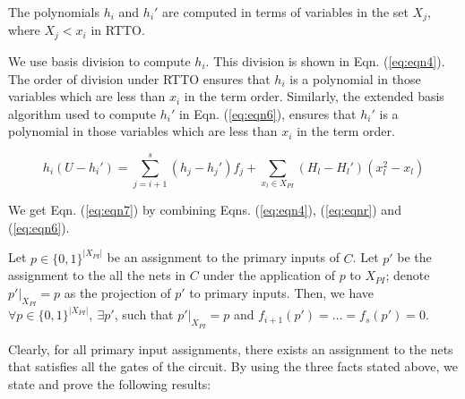 
\begin{Fact}
The polynomials $h_i$ and $h_i'$ are computed in terms of variables in
the set $X_j$, where $X_j < x_i$ in RTTO.  
\end{Fact}

We use \Grobner basis division to compute $h_i$. This division is
shown in Eqn. (\ref{eq:eqn4}). The order of division under RTTO
ensures that $h_i$ is a polynomial in those variables which are less
than $x_i$ in the term order. Similarly, the extended \Grobner basis
algorithm used to compute $h_i'$ in Eqn. (\ref{eq:eqn6}),
ensures that $h_i'$ is a polynomial in those variables which are less
than $x_i$ in the term order. 



\begin{Fact}
{\small 
  \begin{equation}
    h_i(U-h_i') = \sum_{j = i+1}^{s} (h_j-h_j')f_j+\sum_{x_l\in X_{PI}}(H_l-H_l')(x_l^2-x_l)
    \label{eq:eqn7}
\end{equation}
}
\end{Fact}

We get Eqn. (\ref{eq:eqn7}) by combining Eqns. (\ref{eq:eqn4}), (\ref{eq:eqnr}) and (\ref{eq:eqn6}).

\begin{Fact}
  Let $p \in \{0,1\}^{|X_{PI}|}$ be an assignment to the primary
  inputs of $C$. Let $p'$ be the assignment to the all the nets in $C$
  under the application of $p$ to $X_{PI}$; denote $p'|_{X_{PI}} = p$
  as the projection of $p'$ to primary inputs. Then, we have $\forall
  p \in \{0,1\}^{|X_{PI}|},\ \exists p'$, such that $p'|_{X_{PI}} = p$
  and $f_{i+1}(p') = \dots = f_s(p') = 0$. 
\end{Fact}

Clearly, for all primary input assignments, there exists an assignment
to the nets that satisfies all the gates of the circuit. By using the
three facts stated above, we state and prove the following results:


